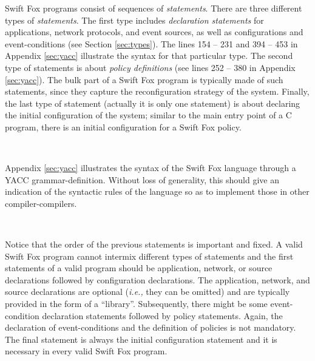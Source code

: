 Swift Fox programs consist of sequences of \textit{statements}. There are
three different types of \textit{statements}. The first type includes
\textit{declaration statements} for applications, network protocols, and
event sources, as well as configurations and event-conditions (see Section 
\ref{sec:types}). The lines 154 -- 231 and 394 -- 453 in Appendix
\ref{sec:yacc} illustrate the syntax for that particular type. The second
type of statements is about \textit{policy definitions} (see lines 252 --
380 in Appendix \ref{sec:yacc}). The bulk part of a Swift Fox program is
typically made of such statements, since they capture the reconfiguration
strategy of the system. Finally, the last type of statement (actually it
is only one statement) is about declaring the initial configuration of the
system; similar to the main entry point of a C program, there is an initial
configuration for a Swift Fox policy.

\

\hangindent=4cm
\small
\noindent
Appendix \ref{sec:yacc} illustrates the syntax of the Swift Fox language
through a YACC grammar-definition. Without loss of generality, this should
give an indication of the syntactic rules of the language so as to
implement those in other compiler-compilers.
\normalsize

\

Notice that the order of the previous statements is important and fixed. A 
valid Swift Fox program cannot intermix different types of statements and
the first statements of a valid program should be application, network, or 
source declarations followed by configuration declarations. The
application, network, and source declarations are optional (\textit{i.e.,} 
they can be omitted) and are typically provided in the form of
a ``library''. Subsequently, there might be some event-condition
declaration statements followed by policy statements. Again, the
declaration of event-conditions and the definition of policies is not
mandatory. The final statement is always the initial configuration
statement and it is necessary in every valid Swift Fox program.

